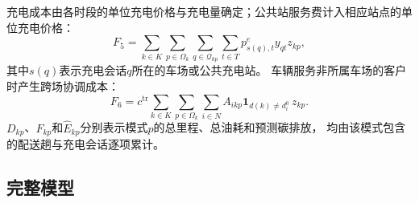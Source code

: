 \documentclass{setp-new}
\begin{document}
充电成本由各时段的单位充电价格与充电量确定；公共站服务费计入相应站点的单位充电价格：
\begin{equation}
F_5=\sum_{k\in K}\sum_{p\in\Omega_k}\sum_{q\in\mathcal Q_{kp}}\sum_{t\in T}
p_{s(q),t}^{e}y_{qt}z_{kp},
\label{eq:F5}
\end{equation}
其中$s(q)$表示充电会话$q$所在的车场或公共充电站。
车辆服务非所属车场的客户时产生跨场协调成本：
\begin{equation}
F_6=c^{\mathrm{tr}}\sum_{k\in K}\sum_{p\in\Omega_k}\sum_{i\in N}A_{ikp}\mathbf 1_{d(k)\neq d_i^0}\,z_{kp}.
\label{eq:F6}
\end{equation}
$D_{kp}$、$F_{kp}$和$\widehat E_{kp}$分别表示模式$p$的总里程、总油耗和预测碳排放，
均由该模式包含的配送趟与充电会话逐项累计。

\subsection{完整模型}
\end{document}
